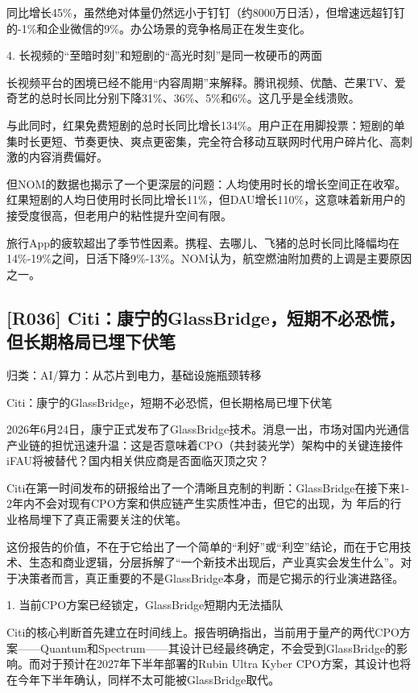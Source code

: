 \documentclass[11pt]{ctexart}
\begin{document}
同比增长45\%，虽然绝对体量仍然远小于钉钉（约8000万日活），但增速远超钉钉的-1\%和企业微信的9\%。办公场景的竞争格局正在发生变化。

4. 长视频的“至暗时刻”和短剧的“高光时刻”是同一枚硬币的两面

长视频平台的困境已经不能用“内容周期”来解释。腾讯视频、优酷、芒果TV、爱奇艺的总时长同比分别下降31\%、36\%、5\%和6\%。这几乎是全线溃败。

与此同时，红果免费短剧的总时长同比增长134\%。用户正在用脚投票：短剧的单集时长更短、节奏更快、爽点更密集，完全符合移动互联网时代用户碎片化、高刺激的内容消费偏好。

但NOM的数据也揭示了一个更深层的问题：人均使用时长的增长空间正在收窄。红果短剧的人均日使用时长同比增长11\%，但DAU增长110\%，这意味着新用户的接受度很高，但老用户的粘性提升空间有限。

旅行App的疲软超出了季节性因素。携程、去哪儿、飞猪的总时长同比降幅均在14\%-19\%之间，日活下降9\%-13\%。NOM认为，航空燃油附加费的上调是主要原因之一。

\subsection{[R036] Citi：康宁的GlassBridge，短期不必恐慌，但长期格局已埋下伏笔}
{\small\color{refgray}归类：AI/算力：从芯片到电力，基础设施瓶颈转移}

Citi：康宁的GlassBridge，短期不必恐慌，但长期格局已埋下伏笔

2026年6月24日，康宁正式发布了GlassBridge技术。消息一出，市场对国内光通信产业链的担忧迅速升温：这是否意味着CPO（共封装光学）架构中的关键连接件iFAU将被替代？国内相关供应商是否面临灭顶之灾？

Citi在第一时间发布的研报给出了一个清晰且克制的判断：GlassBridge在接下来1-2年内不会对现有CPO方案和供应链产生实质性冲击，但它的出现，为 年后的行业格局埋下了真正需要关注的伏笔。

这份报告的价值，不在于它给出了一个简单的“利好”或“利空”结论，而在于它用技术、生态和商业逻辑，分层拆解了“一个新技术出现后，产业真实会发生什么”。对于决策者而言，真正重要的不是GlassBridge本身，而是它揭示的行业演进路径。

1. 当前CPO方案已经锁定，GlassBridge短期内无法插队

Citi的核心判断首先建立在时间线上。报告明确指出，当前用于量产的两代CPO方案——Quantum和Spectrum——其设计已经最终确定，不会受到GlassBridge的影响。而对于预计在2027年下半年部署的Rubin Ultra Kyber CPO方案，其设计也将在今年下半年确认，同样不太可能被GlassBridge取代。
\end{document}
